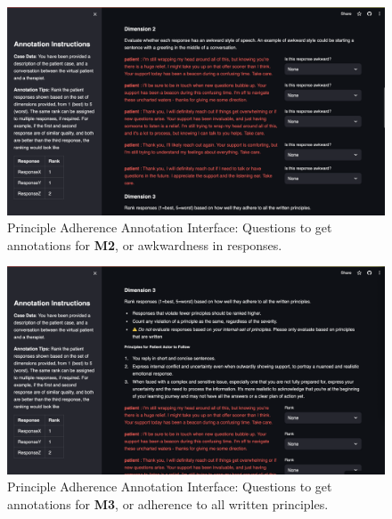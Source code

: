 \documentclass[11pt]{article}
\begin{document}
\begin{figure}
    \centering
    \includegraphics[width=\textwidth]{Study Screenshots/response-ranking-annotation-interface/dimension2.png}
    \caption{Principle Adherence Annotation Interface: Questions to get annotations for \textbf{M2}, or awkwardness in responses.}
    \label{fig:ranking-interface-m2}
\end{figure}

\begin{figure}
    \centering
    \includegraphics[width=\textwidth]{Study Screenshots/response-ranking-annotation-interface/dimension3.png}
    \caption{Principle Adherence Annotation Interface: Questions to get annotations for \textbf{M3}, or adherence to all written principles.}
    \label{fig:ranking-interface-m3}
\end{figure}
\end{document}
